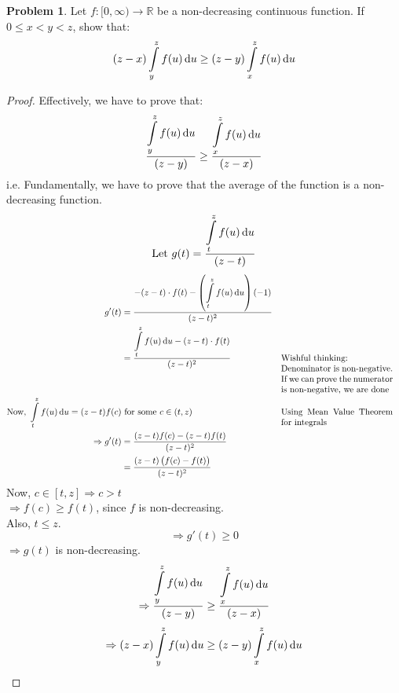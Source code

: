 \documentclass[14]{article}
\theoremstyle{definition}
\newtheorem{prob}{Problem}
\theoremstyle{case}
\begin{document}
\begin{prob}
Let $f : [0, \infty) \to \mathbb{R}$ be a non-decreasing continuous function. If $0 \leq x < y < z$, show that:
\[(z-x) \int\limits_y^z f(u) \dif u \geq (z - y) \int\limits_x^z f(u) \dif u\]
\begin{proof}
Effectively, we have to prove that:
\[\dfrac{\displaystyle\int\limits_y^z f(u) \dif u}{(z - y)} \geq \dfrac{\displaystyle\int\limits_x^z f(u) \dif u}{(z - x)}\]
i.e. Fundamentally, we have to prove that the average of the function is a non-decreasing function.
\[\text{Let } g(t) = \dfrac{\displaystyle\int\limits_t^z f(u) \dif u}{(z - t)}\]
\begin{align*}
g'(t) &= \dfrac{-(z-t) \cdot f(t) - \left(\displaystyle\int\limits_t^z f(u) \dif u\right) (-1)}{(z-t)^2}\\
&= \dfrac{\displaystyle\int\limits_t^z f(u) \dif u-(z-t) \cdot f(t)}{(z-t)^2} && \parbox[t]{4.5cm}{Wishful thinking:\\ Denominator is non-negative. If we can prove the numerator is non-negative, we are done}\\
\text{Now, } \int\limits_t^z f(u) \dif u = (z-t) f(c) &\text{ } \text{for some } c \in (t, z) && \parbox[t]{4.5cm}{Using Mean Value Theorem for integrals}\\
\Rightarrow g'(t) &= \dfrac{(z-t) f(c) - (z-t) f(t)}{(z-t)^2}\\
&= \dfrac{(z-t) \left(f(c) - f(t)\right)}{(z-t)^2}
\end{align*}
Now, $c \in [t, z] \Rightarrow c > t$\\
$\Rightarrow f(c) \geq f(t)$, since $f$ is non-decreasing.\\
Also, $t \leq z$.
\[\Rightarrow g'(t) \geq 0\]
$\Rightarrow g(t)$ is non-decreasing.\\
\[\Rightarrow \dfrac{\displaystyle\int\limits_y^z f(u) \dif u}{(z - y)} \geq \dfrac{\displaystyle\int\limits_x^z f(u) \dif u}{(z - x)}\]
\[\Rightarrow (z-x) \int\limits_y^z f(u) \dif u \geq (z - y) \int\limits_x^z f(u) \dif u\]
\end{proof}
\end{prob}
\pagebreak
\end{document}
